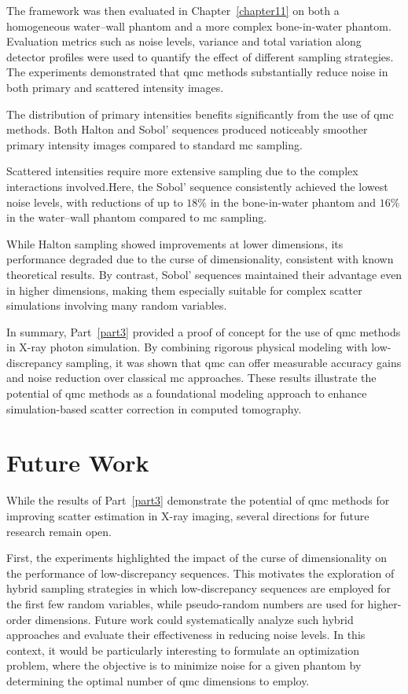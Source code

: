 The framework was then evaluated in Chapter~\ref{chapter11} on both a
homogeneous water--wall phantom and a more complex bone-in-water phantom.
Evaluation metrics such as noise levels, variance and total variation along
detector profiles were used to quantify the effect of different sampling
strategies. The experiments demonstrated that \ac{qmc} methods substantially
reduce noise in both primary and scattered intensity images. 

The distribution of primary intensities benefits 
significantly from the use of \ac{qmc} methods. Both Halton and Sobol'
sequences produced noticeably smoother primary intensity images compared to
standard \ac{mc} sampling. 

Scattered intensities require more extensive sampling due to the complex
interactions involved.Here, the Sobol' sequence consistently achieved the lowest
noise levels, with reductions of up to $18\%$ in the bone-in-water phantom and
$16\%$ in the water--wall phantom compared to \ac{mc} sampling.

While
Halton sampling showed improvements at lower dimensions, its performance
degraded due to the curse of dimensionality, consistent with known theoretical
results. By contrast, Sobol' sequences maintained their advantage even in higher
dimensions, making them especially suitable for complex scatter simulations
involving many random variables.

In summary, Part~\ref{part3} provided a proof of concept for the use of \ac{qmc}
methods in X-ray photon simulation. By combining rigorous physical modeling with
low-discrepancy sampling, it was shown that \ac{qmc} can offer measurable
accuracy gains and noise reduction over classical \ac{mc} approaches. These
results illustrate the potential of \ac{qmc} methods as a foundational modeling
approach to enhance simulation-based scatter correction in computed tomography.


\section{Future Work}

While the results of Part~\ref{part3} demonstrate the potential of \ac{qmc} methods for
improving scatter estimation in X-ray imaging, several directions for future
research remain open.

First, the experiments highlighted the impact of the curse of dimensionality on
the performance of low-discrepancy sequences. This motivates the exploration of
hybrid sampling strategies in which low-discrepancy sequences are employed for
the first few random variables, while pseudo-random numbers are used for
higher-order dimensions. Future work could systematically analyze such hybrid
approaches and evaluate their effectiveness in reducing noise levels. In this
context, it would be particularly interesting to formulate an optimization
problem, where the objective is to minimize noise for a given phantom by
determining the optimal number of \ac{qmc} dimensions to employ.

